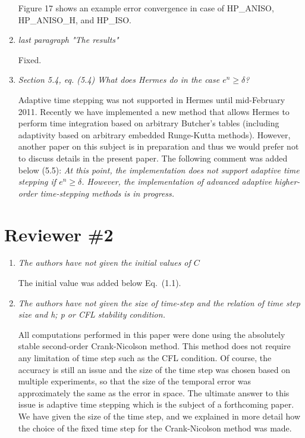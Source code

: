 \documentclass[mathpazo]{cicp}
\begin{document}
\begin{enumerate}
Figure 17 shows an example error convergence in case of HP\_ANISO, HP\_ANISO\_H, and HP\_ISO.

\item \emph{last paragraph "The results"}

Fixed.

\item \emph{Section 5.4, eq. (5.4) What does Hermes do in the case $e^n\geq\delta$?}

Adaptive time stepping was not supported in Hermes until mid-February 2011. Recently we have 
implemented a new method that allows Hermes to perform time integration based on arbitrary Butcher's 
tables (including adaptivity based on arbitrary embedded Runge-Kutta methods). However, another paper on this subject 
is in preparation and thus we would prefer not to discuss details in the present paper. 
The following comment was added below (5.5): \emph{At this point, the implementation does not support
adaptive time stepping if $e^n\geq \delta$. However, the implementation 
of advanced adaptive higher-order time-stepping methods is in progress.}

\end{enumerate}

\section{Reviewer \#2}

\begin{enumerate}

\item \emph{The authors have not given the initial values of $C$}

The initial value was added below Eq.~(1.1).

\item \emph{The authors have not given the size of time-step and the relation
of time step size and h; p or CFL stability condition.}

All computations performed in this paper were done using the absolutely stable 
second-order Crank-Nicolson method. This method does not require any 
limitation of time step such as the CFL condition. Of course, the 
accuracy is still an issue and the size of the time step was chosen 
based on multiple experiments, so that the size of the temporal error 
was approximately the same as the error in space. The ultimate answer 
to this issue is adaptive time stepping which is the subject of a forthcoming 
paper. We have given the size of the time step, and 
we explained in more detail how the choice of the fixed time step
for the Crank-Nicolson method was made.

\end{enumerate}
\end{document}
